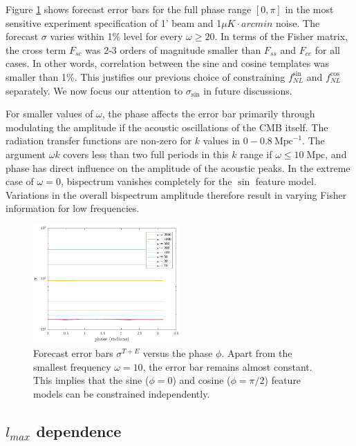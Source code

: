 Figure \ref{forecast_phase_dependence} shows forecast error bars for the full phase range $[0,\pi]$ in the most sensitive experiment specification of 1' beam and 1$\mu K \cdot arcmin$ noise. The forecast $\sigma$ varies within 1\% level for every $\omega\ge20$. In terms of the Fisher matrix, the cross term $F_{sc}$ was 2-3 orders of magnitude smaller than $F_{ss}$ and $F_{cc}$ for all cases. In other words, correlation between the sine and cosine templates was smaller than 1\%. This justifies our previous choice of constraining $f_{NL}^{\sin}$ and $f_{NL}^{\cos}$ separately. We now focus our attention to $\sigma_{\sin}$ in future discussions.

For smaller values of $\omega$, the phase affects the error bar primarily through modulating the amplitude if the acoustic oscillations of the CMB itself. The radiation transfer functions are non-zero for $k$ values in $0 - 0.8 ~\text{Mpc}^{-1}$. The argument $\omega k$ covers less than two full periods in this $k$ range if $\omega \le 10\; \text{Mpc}$, and phase has direct influence on the amplitude of the acoustic peaks. In the extreme case of $\omega=0$, bispectrum vanishes completely for the $\sin$ feature model. Variations in the overall bispectrum amplitude therefore result in varying Fisher information for low frequencies.

\begin{figure}[ht]
	\centering
	\includegraphics[width=0.5\textwidth]{phase_2D.pdf}
	\caption{Forecast error bars $\sigma^{T+E}$ versus the phase $\phi$. Apart from the smallest frequency $\omega=10$, the error bar remains almost constant. This implies that the sine ($\phi=0$) and cosine ($\phi=\pi/2$) feature models can be constrained independently.}
	\label{forecast_phase_dependence}
\end{figure}

\subsection{$l_{max}$ dependence}

